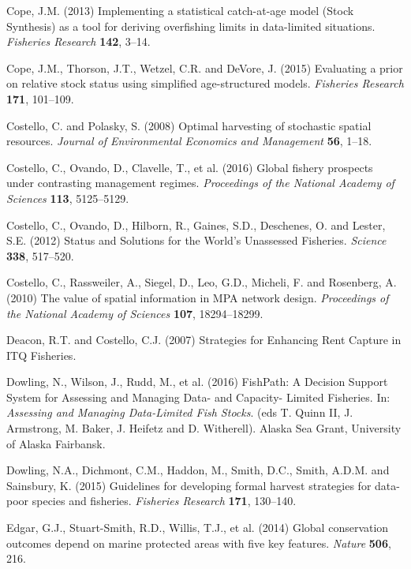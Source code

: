 \documentclass[twoside,12pt,final]{ucthesis-CA2012}
\begin{document}
\begin{ucmainmatter}
\hypertarget{ref-Cope2013}{}
Cope, J.M. (2013) Implementing a statistical catch-at-age model (Stock
Synthesis) as a tool for deriving overfishing limits in data-limited
situations. \emph{Fisheries Research} \textbf{142}, 3--14.

\hypertarget{ref-Cope2015}{}
Cope, J.M., Thorson, J.T., Wetzel, C.R. and DeVore, J. (2015) Evaluating
a prior on relative stock status using simplified age-structured models.
\emph{Fisheries Research} \textbf{171}, 101--109.

\hypertarget{ref-Costello2008}{}
Costello, C. and Polasky, S. (2008) Optimal harvesting of stochastic
spatial resources. \emph{Journal of Environmental Economics and
Management} \textbf{56}, 1--18.

\hypertarget{ref-Costello2016}{}
Costello, C., Ovando, D., Clavelle, T., et al. (2016) Global fishery
prospects under contrasting management regimes. \emph{Proceedings of the
National Academy of Sciences} \textbf{113}, 5125--5129.

\hypertarget{ref-Costello2012a}{}
Costello, C., Ovando, D., Hilborn, R., Gaines, S.D., Deschenes, O. and
Lester, S.E. (2012) Status and Solutions for the World's Unassessed
Fisheries. \emph{Science} \textbf{338}, 517--520.

\hypertarget{ref-Costello2010}{}
Costello, C., Rassweiler, A., Siegel, D., Leo, G.D., Micheli, F. and
Rosenberg, A. (2010) The value of spatial information in MPA network
design. \emph{Proceedings of the National Academy of Sciences}
\textbf{107}, 18294--18299.

\hypertarget{ref-Deacon2007}{}
Deacon, R.T. and Costello, C.J. (2007) Strategies for Enhancing Rent
Capture in ITQ Fisheries.

\hypertarget{ref-Dowling2016}{}
Dowling, N., Wilson, J., Rudd, M., et al. (2016) FishPath: A Decision
Support System for Assessing and Managing Data- and Capacity- Limited
Fisheries. In: \emph{Assessing and Managing Data-Limited Fish Stocks}.
(eds T. Quinn II, J. Armstrong, M. Baker, J. Heifetz and D. Witherell).
Alaska Sea Grant, University of Alaska Fairbansk.

\hypertarget{ref-Dowling2015}{}
Dowling, N.A., Dichmont, C.M., Haddon, M., Smith, D.C., Smith, A.D.M.
and Sainsbury, K. (2015) Guidelines for developing formal harvest
strategies for data-poor species and fisheries. \emph{Fisheries
Research} \textbf{171}, 130--140.

\hypertarget{ref-Edgar2014}{}
Edgar, G.J., Stuart-Smith, R.D., Willis, T.J., et al. (2014) Global
conservation outcomes depend on marine protected areas with five key
features. \emph{Nature} \textbf{506}, 216.


\end{ucmainmatter}
\end{document}
